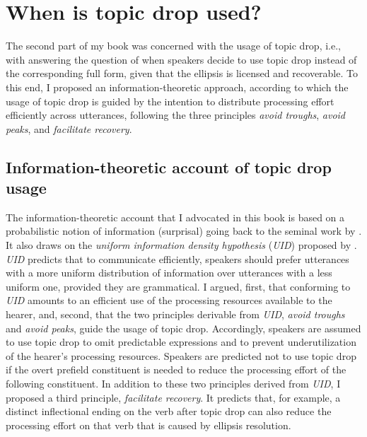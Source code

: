 \section{When is topic drop used?}
The second part of my book was concerned with the usage of topic drop, i.e., with answering the question of when speakers decide to use topic drop instead of the corresponding full form, given that the ellipsis is licensed and recoverable.
To this end, I proposed an information-theoretic approach, according to which the usage of topic drop is guided by the intention to distribute processing effort  efficiently across utterances, following the three principles \textit{avoid troughs}, \textit{avoid peaks}, and \textit{facilitate recovery}. 

\subsection{Information-theoretic account of topic drop usage}
The information-theoretic account that I advocated in this book is based on a probabilistic notion of information (surprisal)  going back to the seminal work by \citet{shannon1948}.
It also draws on the \textit{uniform information density hypothesis} (\textit{UID}) proposed by \citet{levy.jaeger2007}.
\textit{UID} predicts that to communicate efficiently, speakers should prefer utterances with a more uniform distribution of information over utterances with a less uniform one, provided they are grammatical.
I argued, first, that conforming to \textit{UID} amounts to an efficient use of the processing resources available to the hearer, and, second, that the two principles derivable from \textit{UID}, \textit{avoid troughs} and \textit{avoid peaks}, guide the usage of topic drop.
Accordingly, speakers are assumed to use topic drop to omit predictable  expressions and to prevent underutilization of the hearer's processing resources.
Speakers are predicted not to use topic drop if the overt prefield constituent is needed to reduce the processing effort of the following constituent.
In addition to these two principles derived from \textit{UID},  I proposed a third principle, \textit{facilitate recovery}. 
It predicts that, for example, a distinct inflectional ending  on the verb after topic drop can also reduce the processing effort on that verb that is caused by ellipsis resolution.

